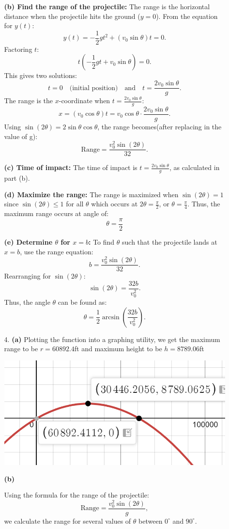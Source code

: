 \documentclass[12pt]{article}
\begin{document}
\begin{enumerate}
\begin{enumerate}
\textbf{(b) Find the range of the projectile:}  
The range is the horizontal distance when the projectile hits the ground ($y = 0$). From the equation for $y(t)$:
\[
y(t) = -\frac{1}{2} g t^2 + (v_0 \sin \theta) t = 0.
\]
Factoring $t$:
\[
t \left( -\frac{1}{2} g t + v_0 \sin \theta \right) = 0.
\]
This gives two solutions:
\[
t = 0 \quad \text{(initial position)} \quad \text{and} \quad t = \frac{2 v_0 \sin \theta}{g}.
\]
The range is the $x$-coordinate when $t = \frac{2 v_0 \sin \theta}{g}$:
\[
x = (v_0 \cos \theta) t = v_0 \cos \theta \cdot \frac{2 v_0 \sin \theta}{g}.
\]
Using $\sin(2\theta) = 2 \sin \theta \cos \theta$, the range becomes(after replacing in the value of g):
\[
\text{Range} = \frac{v_0^2 \sin(2\theta)}{32}.
\]

\textbf{(c) Time of impact:}  
The time of impact is $t = \frac{2 v_0 \sin \theta}{g}$, as calculated in part (b).

\textbf{(d) Maximize the range:}  
The range is maximized when $\sin(2\theta) = 1$ since $\sin(2\theta) \leq 1$ for all $\theta$ which occurs at $2\theta = \frac{\pi}{2}$, or $\theta = \frac{\pi}{4}$. Thus, the maximum range occurs at angle of:
\[
\theta = \frac{\pi}{2}
\]

\textbf{(e) Determine $\theta$ for $x = b$:}  
To find $\theta$ such that the projectile lands at $x = b$, use the range equation:
\[
b = \frac{v_0^2 \sin(2\theta)}{32}.
\]
Rearranging for $\sin(2\theta)$:
\[
\sin(2\theta) = \frac{32b}{v_0^2}.
\]
Thus, the angle $\theta$ can be found as:
\[
\theta = \frac{1}{2} \arcsin\left(\frac{32b}{v_0^2}\right).
\]

\item [4. ]
\textbf{(a)}
Plotting the function into a graphing utility, we get the maximum range to be $r = 60892.4$ft and maximum height to be $h = 8789.06$ft

\includegraphics[width=0.5\linewidth]{Math 134//Images/image.png}

\textbf{(b)}

Using the formula for the range of the projectile:
\[
\text{Range} = \frac{v_0^2 \sin(2\theta)}{g},
\]
we calculate the range for several values of $\theta$ between $0^\circ$ and $90^\circ$.


\end{enumerate}
\end{enumerate}
\end{document}
